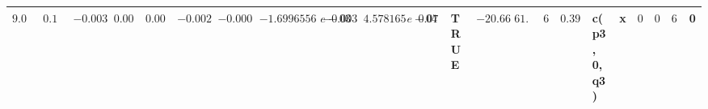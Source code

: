 \begin{table}[!tbp]
\begin{center}
\begin{tabular}{rrrrrrrrrrrlrrrrllrrrl}
$ 9.0938522865601410$&$0.101453062456284$&$-0.00377903413414501$&$ 0.00634957600282194$&$ 0.00414843507153557$&$-0.00207271657793041$&$-0.000306142890063811$&$-1.69965564652029e-03$&$-0.00328741946274589$&$ 4.57816581994886e-04$&$ 0.077417525737800100$&TRUE&$-20.6687118249231$&$61.3374236498462$&$6$&$ 0.39944080721434633$&c(p3, 0, q3)&x&$0$&$0$&$62$&0\tabularnewline
\hline
\end{tabular}\end{center}

\end{table}
